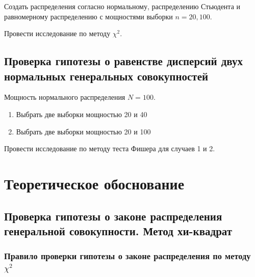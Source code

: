 \documentclass[12pt,a4paper]{article}
\begin{document}
	Создать распределения согласно нормальному, распределению Стьюдента и
	равномерному распределению с мощностями выборки \( n=20, 100 \).

	Провести исследование по методу \( \chi^2 \).

	\subsection{Проверка гипотезы о равенстве дисперсий двух нормальных
		генеральных совокупностей}

		Мощность нормального распределения \( N = 100 \).

		\begin{enumerate}
			\item Выбрать две выборки мощностью 20 и 40
			\item Выбрать две выборки мощностью 20 и 100
		\end{enumerate}

		Провести исследование по методу теста Фишера для случаев 1 и 2.

		\section{Теоретическое обоснование}

		\subsection{Проверка гипотезы о законе распределения генеральной
			совокупности. Метод хи-квадрат}

		\subsubsection{Правило проверки гипотезы о законе распределения по
			методу \( \chi^2 \)}
\end{document}
